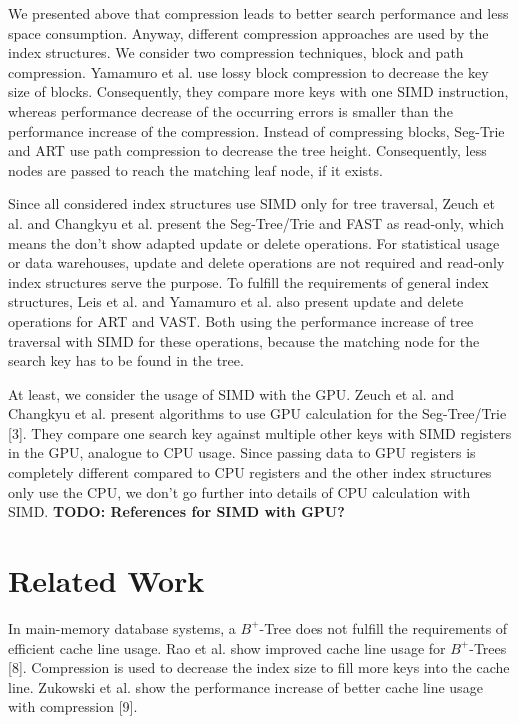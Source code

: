 \documentclass[conference]{IEEEtran}
\begin{document}
We presented above that compression leads to better search performance and less space consumption. Anyway, different compression approaches are used by the index structures. We consider two compression techniques, block and path compression. Yamamuro et al. use lossy block compression to decrease the key size of blocks. Consequently, they compare more keys with one SIMD instruction, whereas performance decrease of the occurring errors is smaller than the performance increase of the compression. Instead of compressing blocks, Seg-Trie and ART use path compression to decrease the tree height. Consequently, less nodes are passed to reach the matching leaf node, if it exists.

Since all considered index structures use SIMD only for tree traversal, Zeuch et al. and Changkyu et al. present the Seg-Tree/Trie and FAST as read-only, which means the don't show adapted update or delete operations. For statistical usage or data warehouses, update and delete operations are not required and read-only index structures serve the purpose. To fulfill the requirements of general index structures, Leis et al. and Yamamuro et al. also present update and delete operations for ART and VAST. Both using the performance increase of tree traversal with SIMD for these operations, because the matching node for the search key has to be found in the tree.

At least, we consider the usage of SIMD with the GPU. Zeuch et al. and Changkyu et al. present algorithms to use GPU calculation for the Seg-Tree/Trie [3]. They compare one search key against multiple other keys with SIMD registers in the GPU, analogue to CPU usage. Since passing data to GPU registers is completely different compared to CPU registers and the other index structures only use the CPU, we don't go further into details of CPU calculation with SIMD. \textbf{TODO: References for SIMD with GPU?}

\section{Related Work}
In main-memory database systems, a $B^+$-Tree does not fulfill the requirements of efficient cache line usage. Rao et al. show improved cache line usage for $B^+$-Trees [8]. Compression is used to decrease the index size to fill more keys into the cache line. Zukowski et al. show the performance increase of better cache line usage with compression [9]. 
\end{document}
